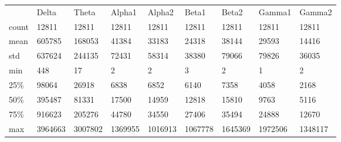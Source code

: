 \begin{table}[]
\begin{tabular}{lllllllll}
      & Delta   & Theta   & Alpha1  & Alpha2  & Beta1   & Beta2   & Gamma1  & Gamma2  \\
count & 12811   & 12811   & 12811   & 12811   & 12811   & 12811   & 12811   & 12811   \\
mean  & 605785  & 168053  & 41384   & 33183   & 24318   & 38144   & 29593   & 14416   \\
std   & 637624  & 244135  & 72431   & 58314   & 38380   & 79066   & 79826   & 36035   \\
min   & 448     & 17      & 2       & 2       & 3       & 2       & 1       & 2       \\
25\%  & 98064   & 26918   & 6838    & 6852    & 6140    & 7358    & 4058    & 2168    \\
50\%  & 395487  & 81331   & 17500   & 14959   & 12818   & 15810   & 9763    & 5116    \\
75\%  & 916623  & 205276  & 44780   & 34550   & 27406   & 35494   & 24888   & 12670   \\
max   & 3964663 & 3007802 & 1369955 & 1016913 & 1067778 & 1645369 & 1972506 & 1348117
\end{tabular}
\end{table}